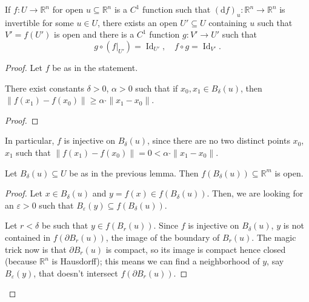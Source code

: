 \documentclass[10pt]{scrartcl}
\providecommand{\eps}{\varepsilon}
\providecommand{\RR}{\mathbb R}
\providecommand{\opname}{\operatorname}
\begin{document}
\begin{theorem}
	If $f\colon U\to\RR^n$ for open $u\subseteq\RR^n$ is a $C^1$ function
	such that $(\mathrm df)_u\colon\RR^n\to\RR^n$ is invertible
	for some $u\in U$, there exists an open $U'\subseteq U$ containing $u$
	such that $V' = f(U')$ is open and there is a
	$C^1$ function $g\colon V'\to U'$ such that
	\[g\circ(f|_{U'}) = \opname{Id}_{U'},\quad
	f\circ g = \opname{Id}_{V'}.\]
\end{theorem}

\begin{proof}
	Let $f$ be as in the statement.
	\begin{lemma*}[Injectivity]
		There exist constants $\delta > 0$, $\alpha > 0$
		such that if $x_0, x_1\in B_{\delta}(u)$, then
		$\|f(x_1) - f(x_0)\|\ge \alpha\cdot\|x_1 - x_0\|$.
	\end{lemma*}
	\begin{proof}
	\end{proof}
	In particular, $f$ is injective on $B_\delta(u)$,
	since there are no two distinct points $x_0$, $x_1$ such that
	$\|f(x_1) - f(x_0)\|  = 0 < \alpha\cdot\|x_1 - x_0\|$.
	
	\begin{lemma*}
		Let $B_\delta(u)\subseteq U$ be as in the previous lemma.
		Then $f(B_\delta(u))\subseteq\RR^m$ is open.
	\end{lemma*}
	\begin{proof}
		Let $x\in B_\delta(u)$ and $y = f(x)\in f(B_\delta(u))$.
		Then, we are looking for an $\eps > 0$ such that
		$B_\eps(y)\subseteq f(B_\delta(u))$.
		
		Let $r < \delta$ be such that $y\in f(B_r(u))$.
		Since $f$ is injective on $B_\delta(u)$,
		$y$ is not contained in $f(\partial B_r(u))$,
		the image of the boundary of $B_r(u)$.
		The magic trick now is that $\partial B_r(u)$ is compact,
		so its image is compact hence closed (because $\RR^n$ is Hausdorff);
		this means we can find a neighborhood of $y$, say $B_\eps(y)$, that
		doesn't intersect $f(\partial B_r(u))$.
		

\end{proof}
\end{proof}
\end{document}
